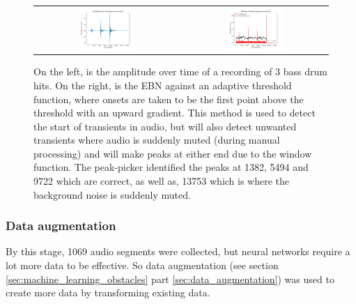 \documentclass[12pt]{article}
\begin{document}
	\begin{figure}[H]
        \centering
        \begin{tabular}{cc}
            \includegraphics[width=0.4\textwidth]{figures/3_bass_drums_amplitude.pdf}&
            \includegraphics[width=0.4\textwidth]{figures/3_bass_drums_ebn_threshold.pdf}\\
        \end{tabular}
        \caption{\footnotesize{On the left, is the amplitude over time of a recording of 3 bass drum hits. On the right, is the EBN against an adaptive threshold function, where onsets are taken to be the first point above the threshold with an upward gradient. This method is used to detect the start of transients in audio, but will also detect unwanted transients where audio is suddenly muted (during manual processing) and will make peaks at either end due to the window function. The peak-picker identified the peaks at 1382, 5494 and 9722 which are correct, as well as, 13753 which is where the background noise is suddenly muted.}}
        \label{fig:energy_based_novelty}   
    \end{figure}
    
    \subsubsection{Data augmentation}
    \label{sec:data_augmentation_methodology}
    
    By this stage, 1069 audio segments were collected, but neural networks require a lot more data to be effective. So data augmentation (see section \ref{sec:machine_learning_obstacles} part \ref{sec:data_augmentation}) was used to create more data by transforming existing data.\medskip
	
\end{document}

